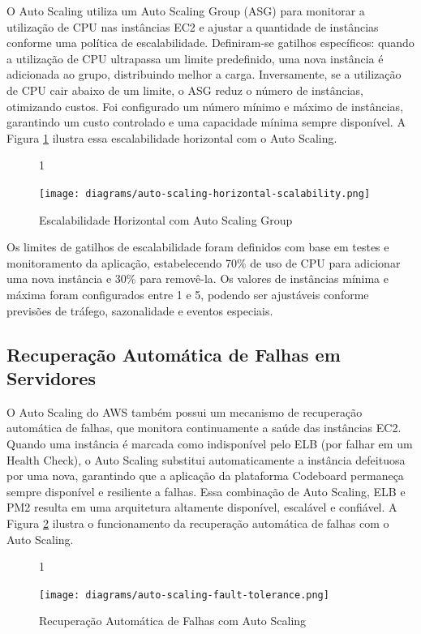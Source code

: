 O Auto Scaling utiliza um Auto Scaling Group (ASG) para monitorar a utilização de CPU nas instâncias EC2 e ajustar a quantidade de instâncias conforme uma política de escalabilidade. Definiram-se gatilhos específicos: quando a utilização de CPU ultrapassa um limite predefinido, uma nova instância é adicionada ao grupo, distribuindo melhor a carga. Inversamente, se a utilização de CPU cair abaixo de um limite, o ASG reduz o número de instâncias, otimizando custos. Foi configurado um número mínimo e máximo de instâncias, garantindo um custo controlado e uma capacidade mínima sempre disponível. A Figura \ref{fig:auto-scaling-horizontal-scalability} ilustra essa escalabilidade horizontal com o Auto Scaling.

\begin{figure}[H]{1\textwidth}
    \centering
    \caption{Escalabilidade Horizontal com Auto Scaling Group}
    \label{fig:auto-scaling-horizontal-scalability}
    \texttt{[image: diagrams/auto-scaling-horizontal-scalability.png]}
\end{figure}

Os limites de gatilhos de escalabilidade foram definidos com base em testes e monitoramento da aplicação, estabelecendo 70\% de uso de CPU para adicionar uma nova instância e 30\% para removê-la. Os valores de instâncias mínima e máxima foram configurados entre 1 e 5, podendo ser ajustáveis conforme previsões de tráfego, sazonalidade e eventos especiais.

\subsection{Recuperação Automática de Falhas em Servidores}

O Auto Scaling do AWS também possui um mecanismo de recuperação automática de falhas, que monitora continuamente a saúde das instâncias EC2. Quando uma instância é marcada como indisponível pelo ELB (por falhar em um Health Check), o Auto Scaling substitui automaticamente a instância defeituosa por uma nova, garantindo que a aplicação da plataforma Codeboard permaneça sempre disponível e resiliente a falhas. Essa combinação de Auto Scaling, ELB e PM2 resulta em uma arquitetura altamente disponível, escalável e confiável. A Figura \ref{fig:auto-scaling-fault-tolerance} ilustra o funcionamento da recuperação automática de falhas com o Auto Scaling.

\begin{figure}[H]{1\textwidth}
    \centering
    \caption{Recuperação Automática de Falhas com Auto Scaling}
    \label{fig:auto-scaling-fault-tolerance}
    \texttt{[image: diagrams/auto-scaling-fault-tolerance.png]}
\end{figure}


